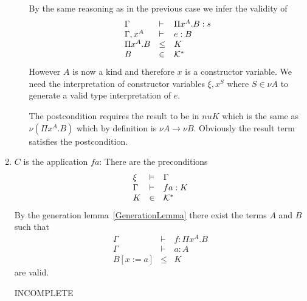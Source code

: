 \begin{definition}
\begin{enumerate}
\begin{enumerate}
            By the same reasoning as in the previous case we infer the validity
            of
            $$
            \begin{array}{lll}
                \Gamma &\vdash& \Pi x^A. B: s
                \\
                \Gamma,x^A &\vdash& e : B
                \\
                \Pi x^A. B &\le& K
                \\
                B &\in& {\cal K}^*
            \end{array}
            $$
            However $A$ is now a kind and therefore $x$ is a constructor
            variable. We need the interpretation of constructor variables
            $\xi,x^S$ where $S \in \nu A$ to generate a valid type
            interpretation of $e$.

            The postcondition requires the result to be in $nu K$ which is the
            same as $\nu (\Pi x^A.B)$ which by definition is $\nu A \to \nu B$.
            Obviously the result term satisfies the postcondition.

        \end{enumerate}

    \item $C$ is the application $f a$:
        There are the preconditions
        $$
        \begin{array}{lll}
            \xi &\vDash& \Gamma
            \\
            \Gamma &\vdash& f a: K
            \\
            K &\in& {\cal K}^*
        \end{array}
        $$
        By the generation lemma~\ref{GenerationLemma} there exist the terms $A$
        and $B$ such that
        $$
        \begin{array}{lll}
            \Gamma &\vdash& f: \Pi x^A. B
            \\
            \Gamma &\vdash& a: A
            \\
            B[x:=a] &\le& K
        \end{array}
        $$
        are valid.

        INCOMPLETE
    \end{enumerate}
\end{definition}
